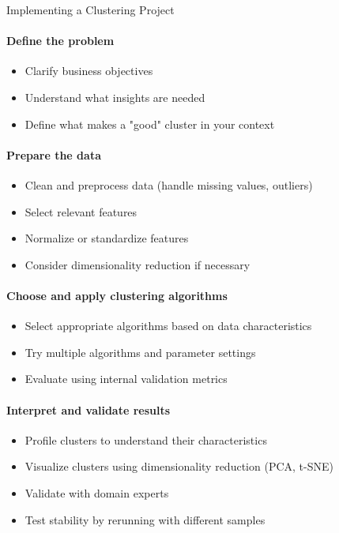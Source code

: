 \begin{KR}{Implementing a Clustering Project}\\
\paragraph{Define the problem}
\begin{itemize}
    \item Clarify business objectives
    \item Understand what insights are needed
    \item Define what makes a "good" cluster in your context
\end{itemize}

\paragraph{Prepare the data}
\begin{itemize}
    \item Clean and preprocess data (handle missing values, outliers)
    \item Select relevant features
    \item Normalize or standardize features
    \item Consider dimensionality reduction if necessary
\end{itemize}

\paragraph{Choose and apply clustering algorithms}
\begin{itemize}
    \item Select appropriate algorithms based on data characteristics
    \item Try multiple algorithms and parameter settings
    \item Evaluate using internal validation metrics
\end{itemize}

\paragraph{Interpret and validate results}
\begin{itemize}
    \item Profile clusters to understand their characteristics
    \item Visualize clusters using dimensionality reduction (PCA, t-SNE)
    \item Validate with domain experts
    \item Test stability by rerunning with different samples
\end{itemize}


\end{KR}
